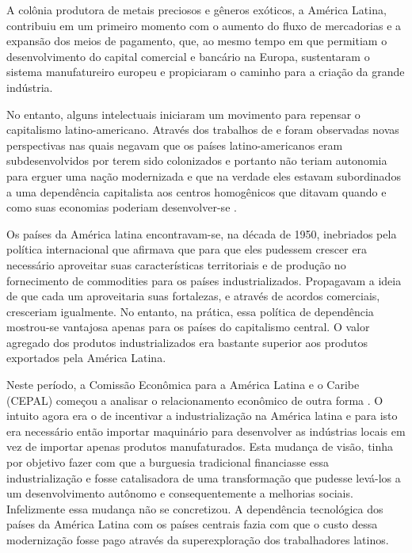 
\begin{citacao}
 A colônia produtora de metais preciosos e gêneros exóticos, a América Latina, contribuiu em um primeiro momento com o aumento do fluxo de mercadorias e a expansão dos meios de pagamento, que, ao mesmo tempo em que permitiam o desenvolvimento do capital comercial e bancário na Europa, sustentaram o sistema manufatureiro europeu e propiciaram o caminho para a criação da grande indústria. \cite{marini2005140}
\end{citacao}

No entanto, alguns intelectuais iniciaram um movimento para repensar o capitalismo latino-americano. Através dos trabalhos de \cite{fernandes1973capitalismo} e \cite{bambirra2012} foram observadas novas perspectivas nas quais negavam que os países latino-americanos eram subdesenvolvidos por terem sido colonizados e portanto não teriam autonomia para erguer uma nação modernizada e que na verdade eles estavam subordinados a uma dependência capitalista aos centros homogênicos que ditavam quando e como suas economias poderiam desenvolver-se \cite{bambirra2012}.

Os países da América latina encontravam-se, na década de 1950, inebriados pela política internacional que afirmava que para que eles pudessem crescer era necessário aproveitar suas características territoriais e de produção no fornecimento de commodities para os países industrializados. Propagavam a ideia de que cada um aproveitaria suas fortalezas, e através de acordos comerciais, cresceriam igualmente. No entanto, na prática, essa política de dependência mostrou-se vantajosa apenas para os países do capitalismo central. O valor agregado dos produtos industrializados era bastante superior aos produtos exportados pela América Latina.

Neste período, a Comissão Econômica para a América Latina e o Caribe (CEPAL) começou a analisar o relacionamento econômico de outra forma \cite{bresser2005iseb}. O intuito agora era o de incentivar a industrialização na América latina e para isto era necessário então importar maquinário para desenvolver as indústrias locais em vez de importar apenas produtos manufaturados. Esta mudança de visão, tinha por objetivo fazer com que a burguesia tradicional financiasse essa industrialização e fosse catalisadora de uma transformação que pudesse levá-los a um desenvolvimento autônomo e consequentemente a melhorias sociais. Infelizmente essa mudança não se concretizou. A dependência tecnológica dos países da América Latina com os países centrais fazia com que o custo dessa modernização fosse pago através da superexploração dos trabalhadores latinos.

